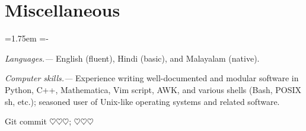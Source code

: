 \documentclass[10pt,a4paper,article,oneside]{memoir}
\def\email#1{\href{mailto:#1}{#1}}
\def\hangpars{%
  \leftskip=1.75em%
  \parindent=-\leftskip%
  \setsecindent{-\leftskip}%
  \setsubsecindent{-\leftskip}%
}
\def\gitError{$\heartsuit\heartsuit\heartsuit$}
\def\gitHash{\gitError}
\def\gitShortHash{\gitError}
\def\gitCommitterDate{\gitError}
\begin{document}

\section{Miscellaneous}

\hangpars

\emph{Languages.---} English (fluent), Hindi (basic), and Malayalam (native).

\emph{Computer skills.---} Experience writing well-documented and modular software in Python, C++, Mathematica, Vim script, AWK, and various shells (Bash, POSIX sh, etc.); seasoned user of Unix-like operating systems and related software.


%


\bigskip

\begin{center}
  \color{gray}
  Git commit \href{https://github.com/manu-mannattil/vitae/tree/\gitHash}{\texttt{\gitShortHash}}; \gitCommitterDate
\end{center}
\end{document}
